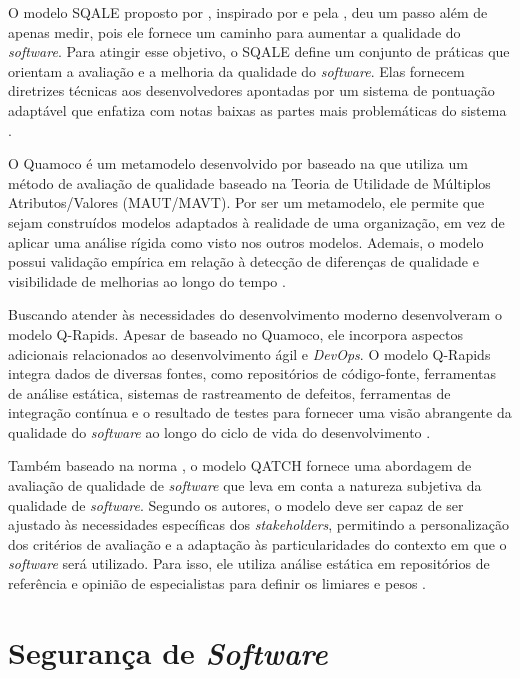 O modelo SQALE proposto por \cite{sqale}, inspirado por  e pela , deu um passo além de apenas medir, pois ele fornece um caminho para aumentar a qualidade do \textit{software}. Para atingir esse objetivo, o SQALE define um conjunto de práticas que orientam a avaliação e a melhoria da qualidade do \textit{software}. Elas fornecem diretrizes técnicas aos desenvolvedores apontadas por um sistema de pontuação adaptável que enfatiza com notas baixas as partes mais problemáticas do sistema \cite{sqale}.

O Quamoco é um metamodelo desenvolvido por  baseado na  que utiliza um método de avaliação de qualidade baseado na Teoria de Utilidade de Múltiplos Atributos/Valores (MAUT/MAVT). Por ser um metamodelo, ele permite que sejam construídos modelos adaptados à realidade de uma organização, em vez de aplicar uma análise rígida como visto nos outros modelos. Ademais, o modelo possui validação empírica em relação à detecção de diferenças de qualidade e visibilidade de melhorias ao longo do tempo \cite{Quamoco}.

Buscando atender às necessidades do desenvolvimento moderno  desenvolveram o modelo Q-Rapids. Apesar de baseado no Quamoco, ele incorpora aspectos adicionais relacionados ao desenvolvimento ágil e \textit{DevOps}. O modelo Q-Rapids integra dados de diversas fontes, como repositórios de código-fonte, ferramentas de análise estática, sistemas de rastreamento de defeitos, ferramentas de integração contínua e o resultado de testes para fornecer uma visão abrangente da qualidade do \textit{software} ao longo do ciclo de vida do desenvolvimento \cite{qrapids}.

Também baseado na norma , o modelo QATCH  fornece uma abordagem de avaliação de qualidade de \textit{software} que leva em conta a natureza subjetiva da qualidade de \textit{software}. Segundo os autores, o modelo deve ser capaz de ser ajustado às necessidades específicas dos \textit{stakeholders}, permitindo a personalização dos critérios de avaliação e a adaptação às particularidades do contexto em que o \textit{software} será utilizado. Para isso, ele utiliza análise estática em repositórios de referência e opinião de especialistas para definir os limiares e pesos \cite{qatch}.

\section{Segurança de \textit{Software}}

